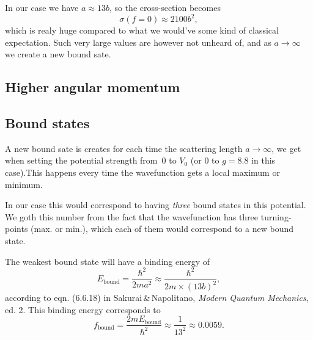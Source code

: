 \documentclass[11pt,letter, swedish, english
]{article}
\begin{document}
In our case we have $a\approx 13b$, so the cross-section becomes
\begin{equation}
\sigma(f{=}0) \approx 2100b^2,
\end{equation}
which is realy huge compared to what we would've some kind of
classical expectation. Such very large values are however not unheard
of, and as $a\to\infty$ we create a new bound sate.

\subsection{Higher angular momentum}


\subsection{Bound states}
A new bound sate is creates for each time the scattering length
$a\to\infty$, we get when setting the potential strength from~0 to
$V_0$ (or 0 to $g=8.8$ in this case).This happens every time the
wavefunction gets a local maximum or minimum. 

In our case this would correspond to having \emph{three} bound states
in this potential. We goth this number from the fact that the
wavefunction has three turning-points (max. or min.), which each of
them would correspond to a new bound state.

The weakest bound state will have a binding energy of
\begin{equation}
E_\text{bound}=\frac{\hbar^2}{2ma^2}\approx\frac{\hbar^2}{2m\times (13b)^2},
\end{equation}
according to eqn. (6.6.18) in Sakurai\,\&\,Napolitano, \textit{Modern
  Quantum Mechanics}, ed. 2.
This binding energy corresponds to 
\begin{equation}
f_\text{bound} = \frac{2mE_\text{bound}}{\hbar^2}
\approx \frac{1}{13^2} \approx 0.0059.
\end{equation}
\end{document}
